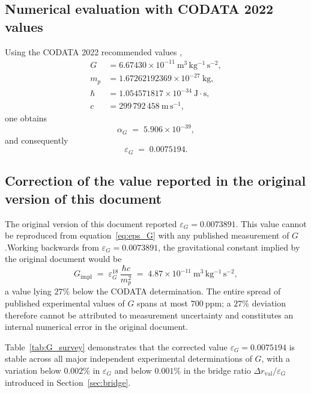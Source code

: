 \documentclass[11pt,a4paper]{article}
\begin{document}
\subsection{Numerical evaluation with CODATA 2022 values}

Using the CODATA 2022 recommended values \cite{CODATA_2022},
\begin{align}
    G      &= 6.67430 \times 10^{-11}\ 
               \mathrm{m^3\,kg^{-1}\,s^{-2}}, 
               \label{eq:G_codata}\\
    m_p    &= 1.67262192369 \times 10^{-27}\ \mathrm{kg},\\
    \hbar  &= 1.054571817   \times 10^{-34}\ \mathrm{J\cdot s},\\
    c      &= 299\,792\,458\ \mathrm{m\,s^{-1}},
\end{align}
one obtains
\begin{equation}
    \alpha_G \;=\; 5.906 \times 10^{-39},
\end{equation}
and consequently
\begin{equation}
    \boxed{\varepsilon_G \;=\; 0.0075194.}
    \label{eq:eps_G_value}
\end{equation}

\subsection{Correction of the value reported in the original version of this document}

The original version of this document \cite{Universal_Coherence_Leakage_2026} reported $\varepsilon_G = 0.0073891$. This value cannot be reproduced from equation~\eqref{eq:eps_G} with any published measurement of $G$.Working backwards from $\varepsilon_G = 0.0073891$, the gravitational constant implied by the original document would be
\begin{equation}
    G_{\mathrm{impl}} 
    \;=\; \varepsilon_G^{18}\,\frac{\hbar c}{m_p^2}
    \;=\; 4.87 \times 10^{-11}\ 
          \mathrm{m^3\,kg^{-1}\,s^{-2}},
\end{equation}
a value lying $27\%$ below the CODATA determination. The entire spread of published experimental values of $G$ spans at most $700\ \mathrm{ppm}$; a $27\%$ deviation therefore cannot be attributed to measurement uncertainty and constitutes an internal numerical error in the original document.

Table~\ref{tab:G_survey} demonstrates that the corrected value $\varepsilon_G = 0.0075194$ is stable across all major independent experimental determinations of $G$, with a variation below $0.002\%$ in $\varepsilon_G$ and below $0.001\%$ in the bridge ratio $\Delta r_{\mathrm{val}}/\varepsilon_G$ introduced in Section~\ref{sec:bridge}.
\end{document}
